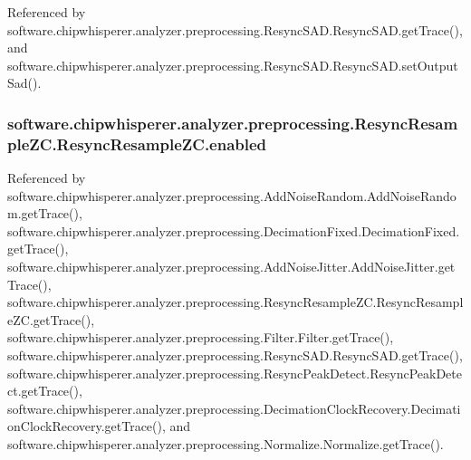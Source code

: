 Referenced by software.\+chipwhisperer.\+analyzer.\+preprocessing.\+Resync\+S\+A\+D.\+Resync\+S\+A\+D.\+get\+Trace(), and software.\+chipwhisperer.\+analyzer.\+preprocessing.\+Resync\+S\+A\+D.\+Resync\+S\+A\+D.\+set\+Output\+Sad().

\hypertarget{classsoftware_1_1chipwhisperer_1_1analyzer_1_1preprocessing_1_1ResyncResampleZC_1_1ResyncResampleZC_a5707ced1e15cf27add9e9a5e2653db1d}{}
\subsubsection[{enabled}]{\setlength{\rightskip}{0pt plus 5cm}software.\+chipwhisperer.\+analyzer.\+preprocessing.\+Resync\+Resample\+Z\+C.\+Resync\+Resample\+Z\+C.\+enabled}\label{classsoftware_1_1chipwhisperer_1_1analyzer_1_1preprocessing_1_1ResyncResampleZC_1_1ResyncResampleZC_a5707ced1e15cf27add9e9a5e2653db1d}


Referenced by software.\+chipwhisperer.\+analyzer.\+preprocessing.\+Add\+Noise\+Random.\+Add\+Noise\+Random.\+get\+Trace(), software.\+chipwhisperer.\+analyzer.\+preprocessing.\+Decimation\+Fixed.\+Decimation\+Fixed.\+get\+Trace(), software.\+chipwhisperer.\+analyzer.\+preprocessing.\+Add\+Noise\+Jitter.\+Add\+Noise\+Jitter.\+get\+Trace(), software.\+chipwhisperer.\+analyzer.\+preprocessing.\+Resync\+Resample\+Z\+C.\+Resync\+Resample\+Z\+C.\+get\+Trace(), software.\+chipwhisperer.\+analyzer.\+preprocessing.\+Filter.\+Filter.\+get\+Trace(), software.\+chipwhisperer.\+analyzer.\+preprocessing.\+Resync\+S\+A\+D.\+Resync\+S\+A\+D.\+get\+Trace(), software.\+chipwhisperer.\+analyzer.\+preprocessing.\+Resync\+Peak\+Detect.\+Resync\+Peak\+Detect.\+get\+Trace(), software.\+chipwhisperer.\+analyzer.\+preprocessing.\+Decimation\+Clock\+Recovery.\+Decimation\+Clock\+Recovery.\+get\+Trace(), and software.\+chipwhisperer.\+analyzer.\+preprocessing.\+Normalize.\+Normalize.\+get\+Trace().

\hypertarget{classsoftware_1_1chipwhisperer_1_1analyzer_1_1preprocessing_1_1ResyncResampleZC_1_1ResyncResampleZC_a8f5b6a1f4802e6dc958b29426d5addf9}{}
